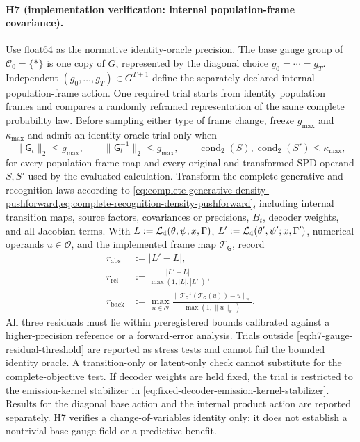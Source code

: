 \paragraph{H7 (implementation verification: internal population-frame covariance).}
Use float64 as the normative identity-oracle precision. The base gauge group of $\mathcal C_0=\{\ast\}$ is one copy of $G$, represented by the diagonal choice $g_0=\cdots=g_T$. Independent $(g_0,\ldots,g_T)\in G^{T+1}$ define the separately declared internal population-frame action. One required trial starts from identity population frames and compares a randomly reframed representation of the same complete probability law. Before sampling either type of frame change, freeze $g_{\max}$ and $\kappa_{\max}$ and admit an identity-oracle trial only when
\begin{equation}
\|\mathsf G_t\|_2\leq g_{\max},
\qquad
\|\mathsf G_t^{-1}\|_2\leq g_{\max},
\qquad
\operatorname{cond}_2(S),\operatorname{cond}_2(S')\leq\kappa_{\max},
\label{eq:h7-gauge-residual-threshold}
\end{equation}
for every population-frame map and every original and transformed SPD operand $S,S'$ used by the evaluated calculation. Transform the complete generative and recognition laws according to \cref{eq:complete-generative-density-pushforward,eq:complete-recognition-density-pushforward}, including internal transition maps, source factors, covariances or precisions, $B_t$, decoder weights, and all Jacobian terms. With $L:=\mathcal L_4(\theta,\psi;x,\Gamma)$, $L':=\mathcal L_4(\theta',\psi';x,\Gamma')$, numerical operands $u\in\mathcal O$, and the implemented frame map $\mathcal T_{\mathsf G}$, record
\begin{equation}
\begin{aligned}
r_{\mathrm{abs}}&:=|L'-L|,\\
r_{\mathrm{rel}}&:=\frac{|L'-L|}{\max(1,|L|,|L'|)},\\
r_{\mathrm{back}}&:=\max_{u\in\mathcal O}
\frac{\|\mathcal T_{\mathsf G}^{-1}(\mathcal T_{\mathsf G}(u))-u\|_{\mathrm F}}
{\max(1,\|u\|_{\mathrm F})}.
\end{aligned}
\label{eq:h7-absolute-relative-backward-residuals}
\end{equation}
All three residuals must lie within preregistered bounds calibrated against a higher-precision reference or a forward-error analysis. Trials outside \cref{eq:h7-gauge-residual-threshold} are reported as stress tests and cannot fail the bounded identity oracle. A transition-only or latent-only check cannot substitute for the complete-objective test. If decoder weights are held fixed, the trial is restricted to the emission-kernel stabilizer in \cref{eq:fixed-decoder-emission-kernel-stabilizer}. Results for the diagonal base action and the internal product action are reported separately. H7 verifies a change-of-variables identity only; it does not establish a nontrivial base gauge field or a predictive benefit.

